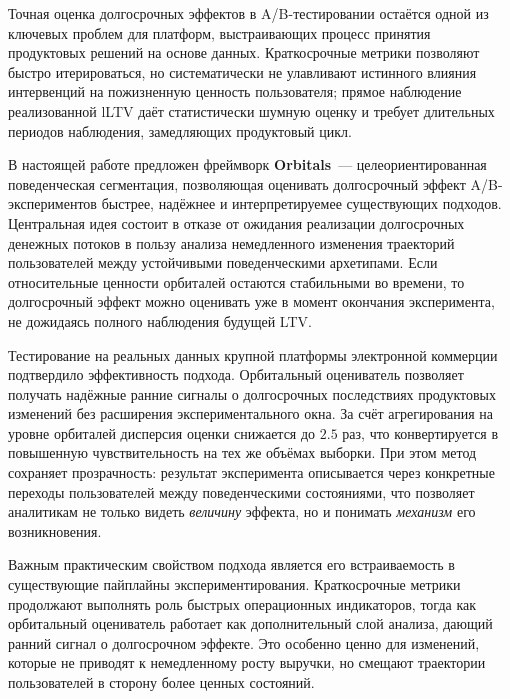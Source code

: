 
Точная оценка долгосрочных эффектов в A/B-тестировании остаётся одной
из ключевых проблем для платформ, выстраивающих процесс принятия
продуктовых решений на основе данных. Краткосрочные метрики позволяют
быстро итерироваться, но систематически не улавливают истинного
влияния интервенций на пожизненную ценность пользователя; прямое
наблюдение реализованной lLTV даёт статистически шумную оценку и
требует длительных периодов наблюдения, замедляющих продуктовый цикл.

В настоящей работе предложен фреймворк \textbf{Orbitals}~---
целеориентированная поведенческая сегментация, позволяющая оценивать
долгосрочный эффект A/B-экспериментов быстрее, надёжнее и
интерпретируемее существующих подходов. Центральная идея состоит в
отказе от ожидания реализации долгосрочных денежных потоков в пользу
анализа немедленного изменения траекторий пользователей между
устойчивыми поведенческими архетипами. Если относительные ценности
орбиталей остаются стабильными во времени, то долгосрочный эффект
можно оценивать уже в момент окончания эксперимента, не дожидаясь
полного наблюдения будущей LTV.

Тестирование на реальных данных крупной платформы электронной
коммерции подтвердило эффективность подхода. Орбитальный оцениватель
позволяет получать надёжные ранние сигналы о долгосрочных
последствиях продуктовых изменений без расширения экспериментального
окна. За счёт агрегирования на уровне орбиталей дисперсия оценки
снижается до $2.5$ раз, что конвертируется в повышенную
чувствительность на тех же объёмах выборки. При этом метод сохраняет
прозрачность: результат эксперимента описывается через конкретные
переходы пользователей между поведенческими состояниями, что
позволяет аналитикам не только видеть \textit{величину} эффекта, но и
понимать \textit{механизм} его возникновения.

Важным практическим свойством подхода является его встраиваемость в
существующие пайплайны экспериментирования. Краткосрочные метрики
продолжают выполнять роль быстрых операционных индикаторов, тогда как
орбитальный оцениватель работает как дополнительный слой анализа,
дающий ранний сигнал о долгосрочном эффекте. Это особенно ценно для
изменений, которые не приводят к немедленному росту выручки, но
смещают траектории пользователей в сторону более ценных состояний.

